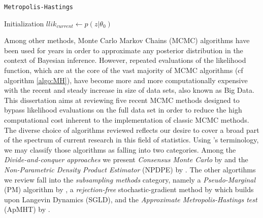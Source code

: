 \documentclass[11pt,a4paper]{report}\usepackage[]{graphicx}\usepackage[]{color}
\begin{document}
\begin{center}
\begin{algorithm}[H]
\caption{\texttt{Metropolis-Hastings}}
\label{algo:MH}
Initialization\;
$llik_{current}\leftarrow p(z|\theta_0)$\;
\end{algorithm}
\end{center}

Among other methods, Monte Carlo Markov Chains (MCMC) algorithms have been used for years in order to approximate any posterior distribution in the context of Bayesian inference. However, repeated evaluations of the likelihood function, which are at the core of the vast majority of MCMC algorithms (cf algorithm \ref{algo:MH}), have become more and more computationally expensive with the recent and steady increase in size of data sets, also known as Big Data.\\
This dissertation aims at reviewing five recent MCMC methods designed to bypass likelihood evaluations on the full data set in order to reduce the high computational cost inherent to the implementation of classic MCMC methods. The diverse choice of algorithms reviewed reflects our desire to cover a broad part of the spectrum of current research in this field of statistics. Using \cite{bardenet2017markov}'s terminology, we may classify those algorithms as falling into two categories.
Among the \textit{Divide-and-conquer approaches} we present \textit{Consensus Monte Carlo} by \cite{scott2016bayes} and the \textit{Non-Parametric Density Product Estimator} (NPDPE) by \cite{neiswanger2013asymptotically}.
The other algortihms we review fall into the \textit{subsampling methods} category, namely a \textit{Pseudo-Marginal} (PM) algorithm by \cite{quiroz2018speeding}, a \textit{rejection-free} stochastic-gradient method by \cite{welling2011bayesian} which builds upon Langevin Dynamics (SGLD), and the \textit{Approximate Metropolis-Hastings test} (ApMHT) by \cite{korattikara2014austerity}. \\
\end{document}
